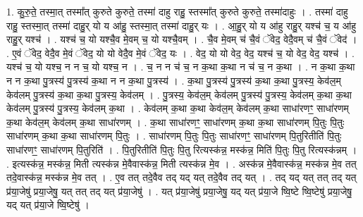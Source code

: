 \documentclass[17pt]{extarticle}
\begin{document}
1. कु॒रु॒ते॒ तस्मा॒त् तस्मा᳚त् कुरुते कुरुते॒ तस्मा॑ दाहु राहु॒ स्तस्मा᳚त् कुरुते कुरुते॒ तस्मा॑दाहुः । . तस्मा॑ दाहु राहु॒ स्तस्मा॒त् तस्मा॑ दाहु॒र् यो य आ॑हु॒ स्तस्मा॒त् तस्मा॑ दाहु॒र् यः । . आ॒हु॒र् यो य आ॑हु राहु॒र् यश्च॑ च॒ य आ॑हु राहु॒र् यश्च॑ । . यश्च॑ च॒ यो यश्चै॒व मे॒वम् च॒ यो यश्चै॒वम् । . चै॒व मे॒वम् च॑ चै॒वं ॅवेद॒ वेदै॒वम् च॑ चै॒वं ॅवेद॑ । . ए॒वं ॅवेद॒ वेदै॒व मे॒वं ॅवेद॒ यो यो वेदै॒व मे॒वं ॅवेद॒ यः । . वेद॒ यो यो वेद॒ वेद॒ यश्च॑ च॒ यो वेद॒ वेद॒ यश्च॑ । . यश्च॑ च॒ यो यश्च॒ न न च॒ यो यश्च॒ न । . च॒ न न च॑ च॒ न क॒था क॒था न च॑ च॒ न क॒था । . न क॒था क॒था न न क॒था पु॒त्रस्य॑ पु॒त्रस्य॑ क॒था न न क॒था पु॒त्रस्य॑ । . क॒था पु॒त्रस्य॑ पु॒त्रस्य॑ क॒था क॒था पु॒त्रस्य॒ केव॑ल॒म् केव॑लम् पु॒त्रस्य॑ क॒था क॒था पु॒त्रस्य॒ केव॑लम् । . पु॒त्रस्य॒ केव॑ल॒म् केव॑लम् पु॒त्रस्य॑ पु॒त्रस्य॒ केव॑लम् क॒था क॒था केव॑लम् पु॒त्रस्य॑ पु॒त्रस्य॒ केव॑लम् क॒था । . केव॑लम् क॒था क॒था केव॑ल॒म् केव॑लम् क॒था साधा॑रणꣳ॒॒ साधा॑रणम् क॒था केव॑ल॒म् केव॑लम् क॒था साधा॑रणम् । . क॒था साधा॑रणꣳ॒॒ साधा॑रणम् क॒था क॒था साधा॑रणम् पि॒तुः पि॒तुः साधा॑रणम् क॒था क॒था साधा॑रणम् पि॒तुः । . साधा॑रणम् पि॒तुः पि॒तुः साधा॑रणꣳ॒॒ साधा॑रणम् पि॒तुरितीति॑ पि॒तुः साधा॑रणꣳ॒॒ साधा॑रणम् पि॒तुरिति॑ । . पि॒तुरितीति॑ पि॒तुः पि॒तु रित्यस्क॑न्न॒ मस्क॑न्न॒ मिति॑ पि॒तुः पि॒तु रित्यस्क॑न्नम् । . इत्यस्क॑न्न॒ मस्क॑न्न॒ मिती त्यस्क॑न्न मे॒वैवास्क॑न्न॒ मिती त्यस्क॑न्न मे॒व । . अस्क॑न्न मे॒वैवास्क॑न्न॒ मस्क॑न्न मे॒व तत् तदे॒वास्क॑न्न॒ मस्क॑न्न मे॒व तत् । . ए॒व तत् तदे॒वैव तद् यद् यत् तदे॒वैव तद् यत् । . तद् यद् यत् तत् तद् यत् प्र॑या॒जेषु॑ प्रया॒जेषु॒ यत् तत् तद् यत् प्र॑या॒जेषु॑ । . यत् प्र॑या॒जेषु॑ प्रया॒जेषु॒ यद् यत् प्र॑या॒जे ष्वि॒ष्टे ष्वि॒ष्टेषु॑ प्रया॒जेषु॒ यद् यत् प्र॑या॒जे ष्वि॒ष्टेषु॑ । \newline
\end{document}
